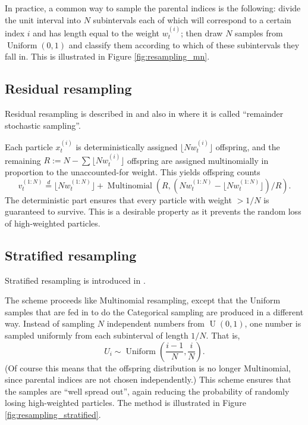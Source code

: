 \documentclass[fleqn]{article}
\theoremstyle{definition}
\newcommand{\eqdist}{\overset{d}{=}}
\newcommand{\Unif}{\operatorname{Uniform}}
\newcommand{\vt}[2][t]{v_{#1}^{(#2)}}
\newcommand{\wt}[2][t]{w_{#1}^{(#2)}}
\begin{document}
In practice, a common way to sample the parental indices is the following: divide the unit interval into $N$ subintervals each of which will correspond to a certain index $i$ and has length equal to the weight $\wt{i}$; then draw $N$ samples from $\Unif(0,1)$ and classify them according to which of these subintervals they fall in. This is illustrated in Figure \ref{fig:resampling_mn}.

\subsection{Residual resampling}
Residual resampling is described in \citet{liu1998} and also in \citet{whitley1994} where it is called ``remainder stochastic sampling''.

Each particle $x_{t}^{(i)}$ is deterministically assigned $\lfloor N \wt{i} \rfloor$ offspring, and the remaining $R := N- \sum \lfloor N w_{t}^{(i)} \rfloor$ offspring are assigned multinomially in proportion to the unaccounted-for weight. 
This yields offspring counts
\begin{equation*}
\vt{1:N} \eqdist \lfloor N \wt{1:N} \rfloor +  \operatorname{Multinomial}(R, (N \wt{1:N} - \lfloor N \wt{1:N}\rfloor)/R) .
\end{equation*}
The deterministic part ensures that every particle with weight $>1/N$ is guaranteed to survive. This is a desirable property as it prevents the random loss of high-weighted particles.

\subsection{Stratified resampling}
Stratified resampling is introduced in \cite{kitagawa1996}.

The scheme proceeds like Multinomial resampling, except that the Uniform samples that are fed in to do the Categorical sampling are produced in a different way.
Instead of sampling $N$ independent numbers from $\operatorname{U}(0,1)$, one number is sampled uniformly from each subinterval of length $1/N$. 
That is, 
\begin{equation*}
U_i \sim \Unif \left(\frac{i-1}{N}, \frac{i}{N} \right) .
\end{equation*}
(Of course this means that the offspring distribution is no longer Multinomial, since parental indices are not chosen independently.)
This scheme ensures that the samples are ``well spread out'', again reducing the probability of randomly losing high-weighted particles.
The method is illustrated in Figure \ref{fig:resampling_stratified}.
\end{document}
